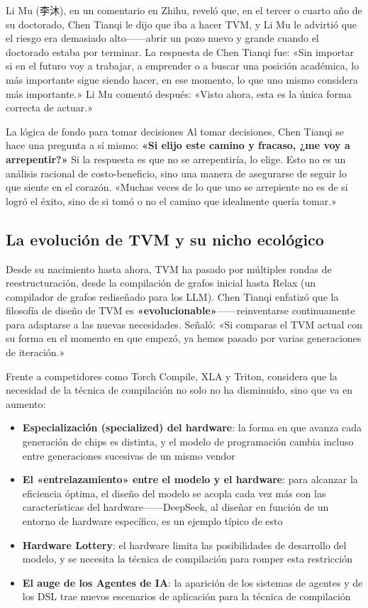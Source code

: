 Li Mu (李沐), en un comentario en Zhihu, reveló que, en el tercer o cuarto año de su doctorado, Chen Tianqi le dijo que iba a hacer TVM, y Li Mu le advirtió que el riesgo era demasiado alto------abrir un pozo nuevo y grande cuando el doctorado estaba por terminar. La respuesta de Chen Tianqi fue: «Sin importar si en el futuro voy a trabajar, a emprender o a buscar una posición académica, lo más importante sigue siendo hacer, en ese momento, lo que uno mismo considera más importante.» Li Mu comentó después: «Visto ahora, esta es la única forma correcta de actuar.»

\begin{importantbox}{La lógica de fondo para tomar decisiones}
Al tomar decisiones, Chen Tianqi se hace una pregunta a sí mismo: \textbf{«Si elijo este camino y fracaso, ¿me voy a arrepentir?»} Si la respuesta es que no se arrepentiría, lo elige. Esto no es un análisis racional de costo-beneficio, sino una manera de asegurarse de seguir lo que siente en el corazón. «Muchas veces de lo que uno se arrepiente no es de si logró el éxito, sino de si tomó o no el camino que idealmente quería tomar.»
\end{importantbox}

\subsection{La evolución de TVM y su nicho ecológico}

Desde su nacimiento hasta ahora, TVM ha pasado por múltiples rondas de reestructuración, desde la compilación de grafos inicial hasta Relax (un compilador de grafos rediseñado para los LLM). Chen Tianqi enfatizó que la filosofía de diseño de TVM es \textbf{«evolucionable»}------reinventarse continuamente para adaptarse a las nuevas necesidades. Señaló: «Si comparas el TVM actual con su forma en el momento en que empezó, ya hemos pasado por varias generaciones de iteración.»

Frente a competidores como Torch Compile, XLA y Triton, considera que la necesidad de la técnica de compilación no solo no ha disminuido, sino que va en aumento:

\begin{itemize}
    \item \textbf{Especialización (specialized) del hardware}: la forma en que avanza cada generación de chips es distinta, y el modelo de programación cambia incluso entre generaciones sucesivas de un mismo vendor
    \item \textbf{El «entrelazamiento» entre el modelo y el hardware}: para alcanzar la eficiencia óptima, el diseño del modelo se acopla cada vez más con las características del hardware------DeepSeek, al diseñar en función de un entorno de hardware específico, es un ejemplo típico de esto
    \item \textbf{Hardware Lottery}: el hardware limita las posibilidades de desarrollo del modelo, y se necesita la técnica de compilación para romper esta restricción
    \item \textbf{El auge de los Agentes de IA}: la aparición de los sistemas de agentes y de los DSL trae nuevos escenarios de aplicación para la técnica de compilación
\end{itemize}

